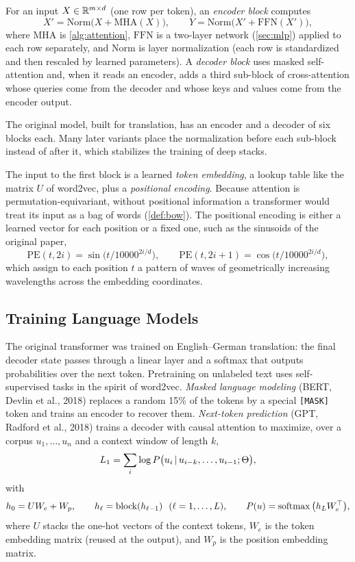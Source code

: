\begin{definition}
For an input $X\in\mathbb{R}^{m\times d}$ (one row per token), an \emph{encoder block} computes
\[
X'=\mathrm{Norm}\big(X+\mathrm{MHA}(X)\big),\qquad Y=\mathrm{Norm}\big(X'+\mathrm{FFN}(X')\big),
\]
where $\mathrm{MHA}$ is \cref{alg:attention}, $\mathrm{FFN}$ is a two-layer network (\cref{sec:mlp}) applied to each row separately, and $\mathrm{Norm}$ is layer normalization (each row is standardized and then rescaled by learned parameters). A \emph{decoder block} uses masked self-attention and, when it reads an encoder, adds a third sub-block of cross-attention whose queries come from the decoder and whose keys and values come from the encoder output.
\end{definition}

The original model, built for translation, has an encoder and a decoder of six blocks each. Many later variants place the normalization before each sub-block instead of after it, which stabilizes the training of deep stacks.

The input to the first block is a learned \emph{token embedding}, a lookup table like the matrix $U$ of word2vec, plus a \emph{positional encoding}. Because attention is permutation-equivariant, without positional information a transformer would treat its input as a bag of words (\cref{def:bow}). The positional encoding is either a learned vector for each position or a fixed one, such as the sinusoids of the original paper,
\[
\mathrm{PE}(t,2i)=\sin\big(t/10000^{2i/d}\big),\qquad \mathrm{PE}(t,2i+1)=\cos\big(t/10000^{2i/d}\big),
\]
which assign to each position $t$ a pattern of waves of geometrically increasing wavelengths across the embedding coordinates.

\subsection{Training Language Models}

The original transformer was trained on English--German translation: the final decoder state passes through a linear layer and a softmax that outputs probabilities over the next token. Pretraining on unlabeled text uses self-supervised tasks in the spirit of word2vec. \emph{Masked language modeling} (BERT, Devlin et al., 2018) replaces a random 15\% of the tokens by a special \texttt{[MASK]} token and trains an encoder to recover them. \emph{Next-token prediction} (GPT, Radford et al., 2018) trains a decoder with causal attention to maximize, over a corpus $u_1,\dots,u_n$ and a context window of length $k$,
\[
L_1=\sum_i\log P\big(u_i\,|\, u_{i-k},\dots,u_{i-1};\Theta\big),
\]
with
\[
h_0=UW_e+W_p,\qquad h_\ell=\mathrm{block}(h_{\ell-1})\ \ (\ell=1,\dots,L),\qquad P(u)=\operatorname{softmax}\big(h_LW_e^{\top}\big),
\]
where $U$ stacks the one-hot vectors of the context tokens, $W_e$ is the token embedding matrix (reused at the output), and $W_p$ is the position embedding matrix.

